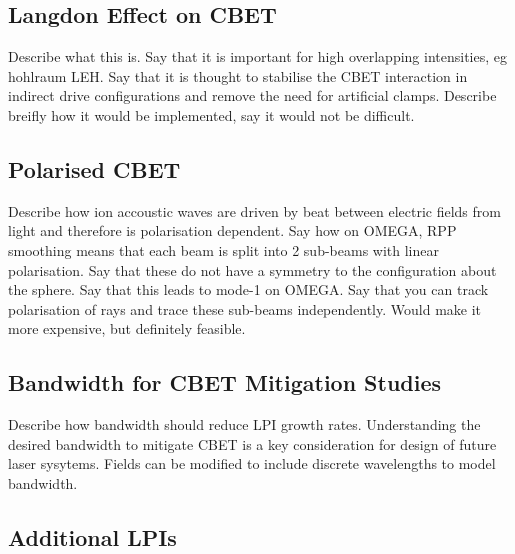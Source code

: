 \subsection{Langdon Effect on CBET}

Describe what this is.
Say that it is important for high overlapping intensities, eg hohlraum LEH.
Say that it is thought to stabilise the CBET interaction in indirect drive configurations and remove the need for artificial clamps.
Describe breifly how it would be implemented, say it would not be difficult.

\subsection{Polarised CBET}

Describe how ion accoustic waves are driven by beat between electric fields from light and therefore is polarisation dependent.
Say how on OMEGA, RPP smoothing means that each beam is split into 2 sub-beams with linear polarisation.
Say that these do not have a symmetry to the configuration about the sphere.
Say that this leads to mode-1 on OMEGA.
Say that you can track polarisation of rays and trace these sub-beams independently.
Would make it more expensive, but definitely feasible.

\subsection{Bandwidth for CBET Mitigation Studies}

Describe how bandwidth should reduce LPI growth rates.
Understanding the desired bandwidth to mitigate CBET is a key consideration for design of future laser sysytems.
Fields can be modified to include discrete wavelengths to model bandwidth.

\subsection{Additional LPIs}


